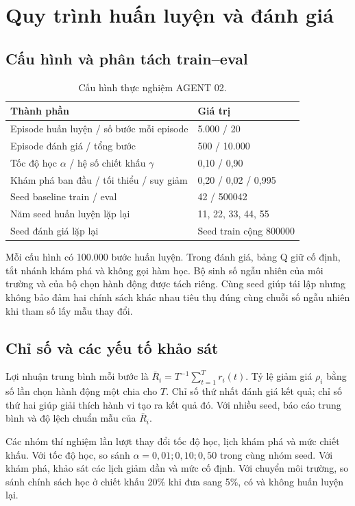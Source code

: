 \section{Quy trình huấn luyện và đánh giá}
\subsection{Cấu hình và phân tách train--eval}
\begin{table}[H]\centering\small\caption{Cấu hình thực nghiệm AGENT 02.}\begin{tabular}{p{7cm}p{6cm}}\toprule Thành phần & Giá trị\\\midrule
Episode huấn luyện / số bước mỗi episode & 5.000 / 20\\
Episode đánh giá / tổng bước & 500 / 10.000\\
Tốc độ học $\alpha$ / hệ số chiết khấu $\gamma$ & 0,10 / 0,90\\
Khám phá ban đầu / tối thiểu / suy giảm & 0,20 / 0,02 / 0,995\\
Seed baseline train / eval & 42 / 500042\\
Năm seed huấn luyện lặp lại & 11, 22, 33, 44, 55\\
Seed đánh giá lặp lại & Seed train cộng 800000\\\bottomrule\end{tabular}\end{table}
Mỗi cấu hình có 100.000 bước huấn luyện. Trong đánh giá, bảng Q giữ cố định, tắt nhánh khám phá và không gọi hàm học. Bộ sinh số ngẫu nhiên của môi trường và của bộ chọn hành động được tách riêng. Cùng seed giúp tái lập nhưng không bảo đảm hai chính sách khác nhau tiêu thụ đúng cùng chuỗi số ngẫu nhiên khi tham số lấy mẫu thay đổi.

\subsection{Chỉ số và các yếu tố khảo sát}
Lợi nhuận trung bình mỗi bước là $\bar R_i=T^{-1}\sum_{t=1}^{T}r_i(t)$. Tỷ lệ giảm giá $\rho_i$ bằng số lần chọn hành động một chia cho $T$. Chỉ số thứ nhất đánh giá kết quả; chỉ số thứ hai giúp giải thích hành vi tạo ra kết quả đó. Với nhiều seed, báo cáo trung bình và độ lệch chuẩn mẫu của $\bar R_i$.

Các nhóm thí nghiệm lần lượt thay đổi tốc độ học, lịch khám phá và mức chiết khấu. Với tốc độ học, so sánh $\alpha=0,01;0,10;0,50$ trong cùng nhóm seed. Với khám phá, khảo sát các lịch giảm dần và mức cố định. Với chuyển môi trường, so sánh chính sách học ở chiết khấu 20\% khi đưa sang 5\%, có và không huấn luyện lại.
